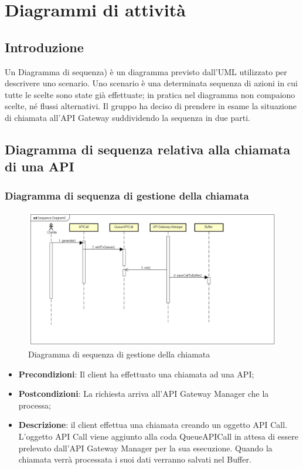 \newpage
\section{Diagrammi di attività}
\subsection{Introduzione}
Un Diagramma di sequenza) è un diagramma previsto dall'UML utilizzato per descrivere uno scenario.
Uno scenario è una determinata sequenza di azioni in cui tutte le scelte sono state già effettuate; in pratica nel diagramma non compaiono scelte, né flussi alternativi.
Il gruppo ha deciso di prendere in esame la situazione di chiamata all'API Gateway suddividendo la sequenza in due parti.

\subsection{Diagramma di sequenza relativa alla chiamata di una API}
\subsubsection{Diagramma di sequenza di gestione della chiamata}
\begin{figure}[h]
	\centering
	\includegraphics[width=1.0\linewidth]{"IMG/Sequence Diagram0"}
	\caption{Diagramma di sequenza di gestione della chiamata}
\end{figure}

\begin{itemize}
	\item \textbf{Precondizioni}: Il client ha effettuato una chiamata ad una API;
	\item \textbf{Postcondizioni}: La richiesta arriva all'API Gateway Manager che la processa;
	\item \textbf{Descrizione}: il client effettua una chiamata creando un oggetto API Call. L'oggetto API Call viene aggiunto alla coda QueueAPICall in attesa di essere prelevato dall'API Gateway Manager per la sua esecuzione. Quando la chiamata verrà processata i suoi dati verranno salvati nel Buffer.
\end{itemize}

